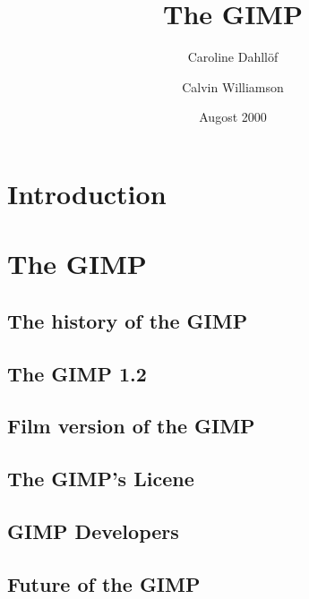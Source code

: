 \documentclass{report}
\begin{document}
\begin{titlepage}
\title{\huge The GIMP}
\author{Caroline Dahll\"{o}f\\ \and Calvin Williamson}
\date{Augost 2000}
\maketitle
\end{titlepage}
\tableofcontents


% 
%



\chapter{Introduction}


\chapter{The GIMP}

\section{The history of the GIMP} 
\section{The GIMP 1.2} 
\section{Film version of the GIMP} 
\section{The GIMP's Licene}
\section{GIMP Developers}
\section{Future of the GIMP} 
\end{document}
